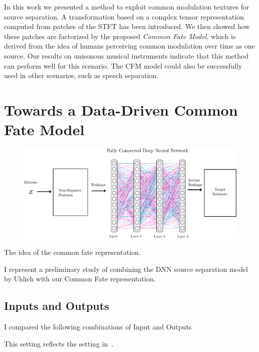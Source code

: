 In this work we presented a method to exploit common modulation textures for source separation. A transformation based on a complex tensor representation computed from patches of the STFT has been introduced. We then showed how these patches are factorized by the proposed \emph{Common Fate Model}, which is derived from the idea of humans perceiving common modulation over time as one source. Our results on unisonous musical instruments indicate that this method can perform well for this scenario. The CFM model could also be successfully used in other scenarios, such as speech separation.

\section{Towards a Data-Driven Common Fate Model}

\begin{figure}[ht!]
\centering
		\includegraphics[width=\textwidth]{Chapters/06_Separation_Unknown/figures/uhlich_dnn.pdf}
\caption{}
\label{fig:cft_dnn}
\end{figure}

The idea of the common fate representation.

I represent a preliminary study of combining the DNN source separation model by Uhlich with our Common Fate representation.

\subsection{Inputs and Outputs}

I compared the following combinations of Input and Outputs

\begin{description}[style=unboxed,leftmargin=0cm]
\item[STFT-STFT] This setting reflects the setting in~\cite{Uhlich15}.
\end{description}

